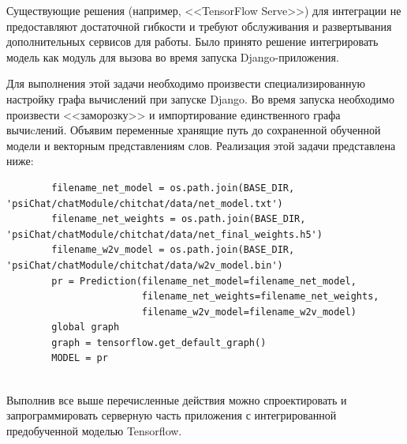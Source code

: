 Существующие решения (например, <<TensorFlow Serve>>) для интеграции не предоставляют достаточной гибкости и требуют обслуживания и развертывания дополнительных сервисов для работы. Было принято решение интегрировать модель как модуль для вызова во время запуска Django-приложения. 

Для выполнения этой задачи необходимо произвести специализированную настройку графа вычислений при запуске Django. Во время запуска необходимо произвести <<заморозку>> и импортирование единственного графа вычиcлений. Объявим переменные хранящие путь до сохраненной обученной модели и векторным представлениям слов. Реализация этой задачи представлена ниже: 

\begin{minipage}{0.9\textwidth}
        \begin{verbatim}
        filename_net_model = os.path.join(BASE_DIR, 'psiChat/chatModule/chitchat/data/net_model.txt')
        filename_net_weights = os.path.join(BASE_DIR, 'psiChat/chatModule/chitchat/data/net_final_weights.h5')
        filename_w2v_model = os.path.join(BASE_DIR, 'psiChat/chatModule/chitchat/data/w2v_model.bin')
        pr = Prediction(filename_net_model=filename_net_model,
                        filename_net_weights=filename_net_weights,
                        filename_w2v_model=filename_w2v_model)
        global graph
        graph = tensorflow.get_default_graph()
        MODEL = pr
        \end{verbatim}
\end{minipage}\\[1.5pt]

Выполнив все выше перечисленные действия можно спроектировать и запрограммировать серверную часть приложения с интегрированной предобученной моделью Tensorflow.


